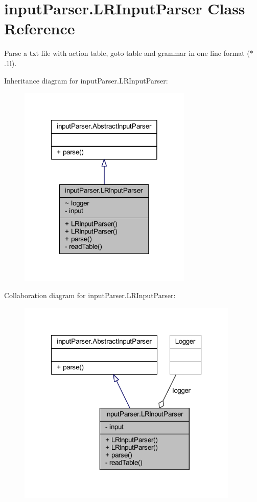 \hypertarget{classinput_parser_1_1_l_r_input_parser}{\section{input\-Parser.\-L\-R\-Input\-Parser Class Reference}
\label{classinput_parser_1_1_l_r_input_parser}
}


Parse a txt file with action table, goto table and grammar in one line format ($\ast$.1l).  




Inheritance diagram for input\-Parser.\-L\-R\-Input\-Parser\-:
\nopagebreak
\begin{figure}[H]
\begin{center}
\leavevmode
\includegraphics[width=234pt]{classinput_parser_1_1_l_r_input_parser__inherit__graph}
\end{center}
\end{figure}


Collaboration diagram for input\-Parser.\-L\-R\-Input\-Parser\-:
\nopagebreak
\begin{figure}[H]
\begin{center}
\leavevmode
\includegraphics[width=299pt]{classinput_parser_1_1_l_r_input_parser__coll__graph}
\end{center}
\end{figure}
